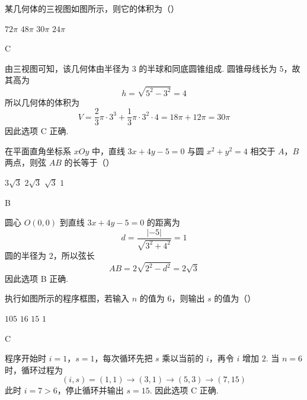 \begin{problem}
某几何体的三视图如图所示，则它的体积为（\quad）


\choices
    {\(72\pi\)}
    {\(48\pi\)}
    {\(30\pi\)}
    {\(24\pi\)}
\end{problem}

\begin{answer}
C
\end{answer}

\begin{solution}
由三视图可知，该几何体由半径为 \(3\) 的半球和同底圆锥组成. 圆锥母线长为 \(5\)，故其高为
\[
h=\sqrt{5^2-3^2}=4
\]
所以几何体的体积为
\[
V=\frac{2}{3}\pi\cdot3^3+\frac{1}{3}\pi\cdot3^2\cdot4=18\pi+12\pi=30\pi
\]
因此选项 C 正确.
\end{solution}

\begin{problem}
在平面直角坐标系 \(xOy\) 中，直线 \(3x + 4y - 5 = 0\) 与圆 \(x^{2} + y^{2} = 4\) 相交于 \(A\)，\(B\) 两点，则弦 \(AB\) 的长等于（\quad）

\choices
    {\(3\sqrt{3}\)}
    {\(2\sqrt{3}\)}
    {\(\sqrt{3}\)}
    {\(1\)}
\end{problem}

\begin{answer}
B
\end{answer}

\begin{solution}
圆心 \(O(0,0)\) 到直线 \(3x+4y-5=0\) 的距离为
\[
d=\frac{|-5|}{\sqrt{3^2+4^2}}=1
\]
圆的半径为 \(2\)，所以弦长
\[
AB=2\sqrt{2^2-d^2}=2\sqrt3
\]
因此选项 B 正确.
\end{solution}

\begin{problem}
执行如图所示的程序框图，若输入 \(n\) 的值为 \(6\)，则输出 \(s\) 的值为（\quad）


\choices
    {\(105\)}
    {\(16\)}
    {\(15\)}
    {\(1\)}
\end{problem}

\begin{answer}
C
\end{answer}

\begin{solution}
程序开始时 \(i=1\)，\(s=1\)，每次循环先把 \(s\) 乘以当前的 \(i\)，再令 \(i\) 增加 \(2\). 当 \(n=6\) 时，循环过程为
\[
(i,s)=(1,1)\longrightarrow(3,1)\longrightarrow(5,3)\longrightarrow(7,15)
\]
此时 \(i=7>6\)，停止循环并输出 \(s=15\). 因此选项 C 正确.
\end{solution}

